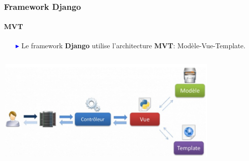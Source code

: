 \begin{frame}
\frametitle{Framework Django}
\framesubtitle{MVT}
\transwipe[duration=1]
\begin{itemize}
\item[\textcolor{blue}{$\blacktriangleright$}] Le framework \textcolor{backgroundcolor}{\textbf{Django}} utilise l'architecture \textcolor{backgroundcolor}{\textbf{MVT}}: Modèle-Vue-Template.
\end{itemize}
\begin{columns}
\begin{column}{11cm}
\includegraphics[width=11cm,height=5cm]{images/mvt.png}
\end{column}
\end{columns}
\end{frame}

